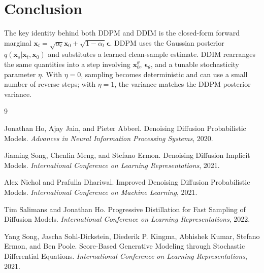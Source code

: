 \documentclass[11pt]{article}
\newcommand{\bx}{\mathbf{x}}
\newcommand{\beps}{\boldsymbol{\epsilon}}
\begin{document}
\section{Conclusion}

The key identity behind both DDPM and DDIM is the closed-form forward marginal
$\bx_t=\sqrt{\alpha_t}\bx_0+\sqrt{1-\alpha_t}\beps$.  DDPM uses the Gaussian posterior
$q(\bx_s|\bx_t,\bx_0)$ and substitutes a learned clean-sample estimate.  DDIM rearranges the same
quantities into a step involving $\bx_0^\theta$, $\beps_\theta$, and a tunable stochasticity parameter
$\eta$.  With $\eta=0$, sampling becomes deterministic and can use a small number of reverse steps;
with $\eta=1$, the variance matches the DDPM posterior variance.

\begin{thebibliography}{9}

Jonathan Ho, Ajay Jain, and Pieter Abbeel.
\newblock Denoising Diffusion Probabilistic Models.
\newblock \emph{Advances in Neural Information Processing Systems}, 2020.

Jiaming Song, Chenlin Meng, and Stefano Ermon.
\newblock Denoising Diffusion Implicit Models.
\newblock \emph{International Conference on Learning Representations}, 2021.

Alex Nichol and Prafulla Dhariwal.
\newblock Improved Denoising Diffusion Probabilistic Models.
\newblock \emph{International Conference on Machine Learning}, 2021.

Tim Salimans and Jonathan Ho.
\newblock Progressive Distillation for Fast Sampling of Diffusion Models.
\newblock \emph{International Conference on Learning Representations}, 2022.

Yang Song, Jascha Sohl-Dickstein, Diederik P. Kingma, Abhishek Kumar, Stefano Ermon, and Ben Poole.
\newblock Score-Based Generative Modeling through Stochastic Differential Equations.
\newblock \emph{International Conference on Learning Representations}, 2021.

\end{thebibliography}
\end{document}
